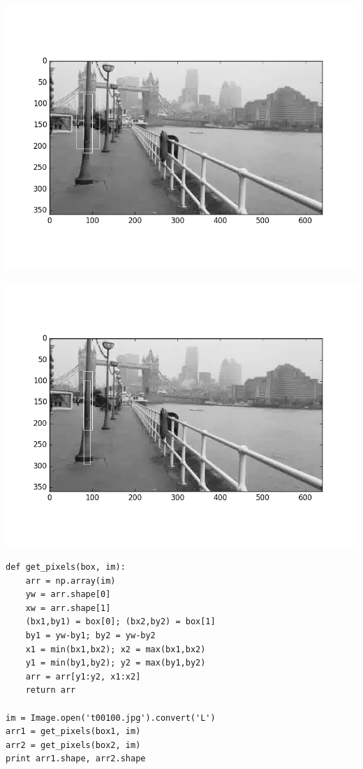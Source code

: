 \documentclass[12pt,fleqn]{article}\usepackage{../../common}
\begin{document}
\includegraphics[height=10cm]{vision_50colreg_03.png}

\includegraphics[height=10cm]{vision_50colreg_04.png}

\begin{verbatim}
def get_pixels(box, im):
    arr = np.array(im)
    yw = arr.shape[0]
    xw = arr.shape[1]
    (bx1,by1) = box[0]; (bx2,by2) = box[1]
    by1 = yw-by1; by2 = yw-by2
    x1 = min(bx1,bx2); x2 = max(bx1,bx2)
    y1 = min(by1,by2); y2 = max(by1,by2)
    arr = arr[y1:y2, x1:x2]
    return arr
    
im = Image.open('t00100.jpg').convert('L')
arr1 = get_pixels(box1, im) 
arr2 = get_pixels(box2, im) 
print arr1.shape, arr2.shape
\end{verbatim}
\end{document}

